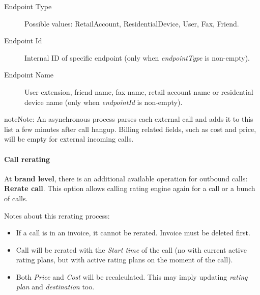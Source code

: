 \documentclass[letterpaper,10pt,english]{sphinxmanual}
\begin{document}
\begin{description}
\item[{Endpoint Type}] \leavevmode{}\label{administration_portal/client/residential/calls/external_calls:term-endpoint-type}
Possible values: RetailAccount, ResidentialDevice, User, Fax, Friend.

\item[{Endpoint Id}] \leavevmode{}\label{administration_portal/client/residential/calls/external_calls:term-endpoint-id}
Internal ID of specific endpoint (only when \emph{endpointType} is non-empty).

\item[{Endpoint Name}] \leavevmode{}\label{administration_portal/client/residential/calls/external_calls:term-endpoint-name}
User extension, friend name, fax name, retail account name or residential device name (only when \emph{endpointId} is non-empty).

\end{description}

\begin{notice}{note}{Note:}
An asynchronous process parses each external call and adds it to this list a few minutes after call hangup. Billing related fields, such as cost and price, will be empty for external incoming calls.
\end{notice}


\paragraph{Call rerating}
\label{administration_portal/client/residential/calls/external_calls:call-rerating}
At \textbf{brand level}, there is an additional available operation for outbound calls: \textbf{Rerate call}. This option allows calling rating engine again for a call or a bunch of calls.

Notes about this rerating process:
\begin{itemize}
\item {} 
If a call is in an invoice, it cannot be rerated. Invoice must be deleted first.

\item {} 
Call will be rerated with the \emph{Start time} of the call (no with current active rating plans, but with active rating plans
on the moment of the call).

\item {} 
Both \emph{Price} and \emph{Cost} will be recalculated. This may imply updating \emph{rating plan} and \emph{destination} too.

\end{itemize}
\end{document}
